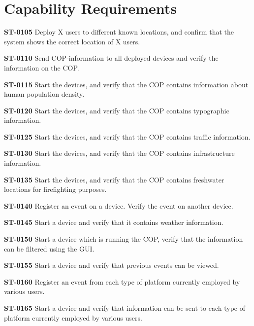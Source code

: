 \section{Capability Requirements}
\begin{description}

\item\textbf{ST-0105} Deploy X users to different known locations, and confirm that the system shows the correct location of X users. \\
\item\textbf{ST-0110} Send COP-information to all deployed devices and verify the information on the COP. \\
\item\textbf{ST-0115} Start the devices, and verify that the COP contains information about human population density. \\
\item\textbf{ST-0120} Start the devices, and verify that the COP contains typographic information. \\
\item\textbf{ST-0125} Start the devices, and verify that the COP contains traffic information. \\
\item\textbf{ST-0130} Start the devices, and verify that the COP contains infrastructure information. \\
\item\textbf{ST-0135} Start the devices, and verify that the COP contains freshwater locations for firefighting purposes. \\
\item\textbf{ST-0140} Register an event on a device. Verify the event on another device. \\
\item\textbf{ST-0145} Start a device and verify that it contains weather information. \\
\item\textbf{ST-0150} Start a device which is running the COP, verify that the information can be filtered using the GUI. \\
\item\textbf{ST-0155} Start a device and verify that previous events can be viewed. \\
\item\textbf{ST-0160} Register an event from each type of platform currently employed by various users. \\
\item\textbf{ST-0165} Start a device and verify that information can be sent to each type of platform currently employed by various users. \\

\end{description}
